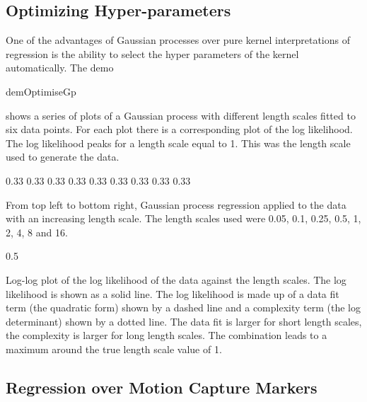 \subsection{Optimizing Hyper-parameters}

One of the advantages of Gaussian processes over pure kernel
interpretations of regression is the ability to select the hyper
parameters of the kernel automatically. The demo

\begin{octave}
 demOptimiseGp
\end{octave}

shows a series of plots of a Gaussian process with different length
scales fitted to six data points. For each plot there is a
corresponding plot of the log likelihood. The log likelihood peaks for
a length scale equal to 1. This was the length scale used to generate
the data.

\begin{center} 0.33\textwidth {} 0.33\textwidth {}
0.33\textwidth {} 0.33\textwidth {} 0.33\textwidth {} 0.33\textwidth {} 0.33\textwidth {} 0.33\textwidth {}
0.33\textwidth

From top left to bottom right, Gaussian process
regression applied to the data with an increasing length scale. The
length scales used were 0.05, 0.1, 0.25, 0.5, 1, 2, 4, 8 and
16. 

 0.5\textwidth 

Log-log plot of
the log likelihood of the data against the length scales. The log
likelihood is shown as a solid line. The log likelihood is made up of
a data fit term (the quadratic form) shown by a dashed line and a
complexity term (the log determinant) shown by a dotted line. The data
fit is larger for short length scales, the complexity is larger for
long length scales. The combination leads to a maximum around the true
length scale value of 1.

\end{center}

\subsection{Regression over Motion Capture Markers}

